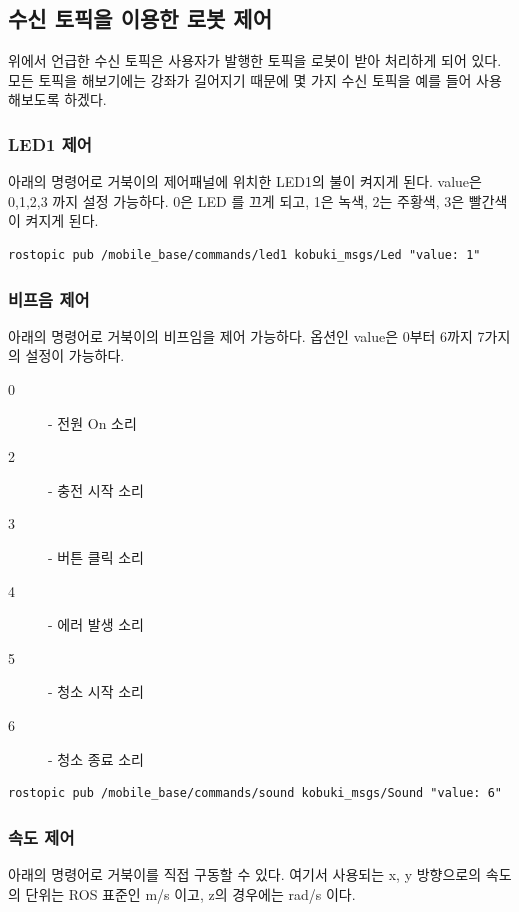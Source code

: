 \subsection{수신 토픽을 이용한 로봇 제어}

위에서 언급한 수신 토픽은 사용자가 발행한 토픽을 로봇이 받아 처리하게 되어 있다. 모든 토픽을 해보기에는 강좌가 길어지기 때문에 몇 가지 수신 토픽을 예를 들어 사용해보도록 하겠다.

\subsubsection{LED1 제어}
아래의 명령어로 거북이의 제어패널에 위치한 LED1의 불이 켜지게 된다. value은 0,1,2,3 까지 설정 가능하다. 0은 LED 를 끄게 되고, 1은 녹색, 2는 주황색, 3은 빨간색이 켜지게 된다.

\begin{lstlisting}[language=ROS]
rostopic pub /mobile_base/commands/led1 kobuki_msgs/Led "value: 1"
\end{lstlisting}


\subsubsection{비프음 제어}
아래의 명령어로 거북이의 비프임을 제어 가능하다. 옵션인 value은 0부터 6까지 7가지의 설정이 가능하다. 

\begin{description}
\item[0] - 전원 On 소리
\item[2] - 충전 시작  소리
\item[3] - 버튼 클릭 소리
\item[4] - 에러 발생 소리
\item[5] - 청소 시작 소리
\item[6] - 청소 종료 소리
\end{description}

\begin{lstlisting}[language=ROS]
rostopic pub /mobile_base/commands/sound kobuki_msgs/Sound "value: 6"
\end{lstlisting}


\subsubsection{속도 제어}

아래의 명령어로 거북이를 직접 구동할 수 있다. 여기서 사용되는 x, y 방향으로의 속도의 단위는 ROS 표준인 m/s 이고, z의 경우에는 rad/s 이다. 

